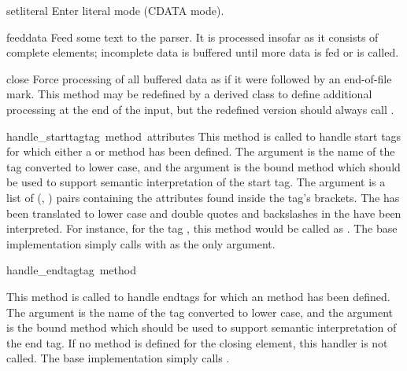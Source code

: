\begin{funcdesc}{setliteral}{}
Enter literal mode (CDATA mode).
\end{funcdesc}

\begin{funcdesc}{feed}{data}
Feed some text to the parser.  It is processed insofar as it consists
of complete elements; incomplete data is buffered until more data is
fed or  is called.
\end{funcdesc}

\begin{funcdesc}{close}{}
Force processing of all buffered data as if it were followed by an
end-of-file mark.  This method may be redefined by a derived class to
define additional processing at the end of the input, but the
redefined version should always call .
\end{funcdesc}

\begin{funcdesc}{handle_starttag}{tag\, method\, attributes}
This method is called to handle start tags for which either a
 or  method has been
defined.  The  argument is the name of the tag converted to
lower case, and the  argument is the bound method which
should be used to support semantic interpretation of the start tag.
The  argument is a list of (, )
pairs containing the attributes found inside the tag's \code{<>}
brackets.  The  has been translated to lower case and double
quotes and backslashes in the  have been interpreted.  For
instance, for the tag , this
method would be called as .  The base implementation simply calls
 with  as the only argument.
\end{funcdesc}

\begin{funcdesc}{handle_endtag}{tag\, method}

This method is called to handle endtags for which an
 method has been defined.  The 
argument is the name of the tag converted to lower case, and the
 argument is the bound method which should be used to
support semantic interpretation of the end tag.  If no
 method is defined for the closing element, this
handler is not called.  The base implementation simply calls
.
\end{funcdesc}

